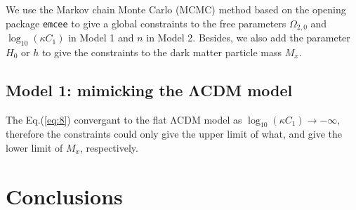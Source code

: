 \documentclass[twocolumn]{aastex631}
\begin{document}
   We use the Markov chain Monte Carlo (MCMC) method based 
   on the opening package \texttt{emcee} to give a global constraints
   to the free parameters $\Omega_{2,0}$ and $\log_{10}(\kappa C_1)$ in 
   Model 1 and $n$ in Model 2.
   Besides, we also add the parameter $H_0$ or $h$ to give the constraints
   to the dark matter particle mass $M_x$.

\subsection{Model 1: mimicking the ΛCDM model}

   The Eq.(\ref{eq:8}) convergant to the flat ΛCDM model as
   $\log_{10}(\kappa C_1)\to-\infty$, therefore the constraints
   could only give the upper limit of what, and give the lower limit
   of $M_x$, respectively.

   \begin{figure}[htbp]
      \centering
   \end{figure}

\section{Conclusions}



\end{document}

